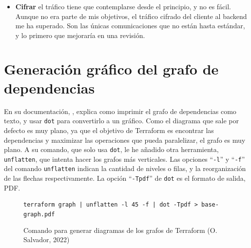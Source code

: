 \documentclass[11pt]{article}
\begin{document}
\begin{flushleft}
\begin{itemize}
            \item \textbf{Cifrar} el tráfico tiene que contemplarse desde el principio, y no es fácil. Aunque no era parte de mis objetivos, el tráfico cifrado del cliente al backend me ha superado. Son las únicas comunicaciones que no están hasta estándar, y lo primero que mejoraría en una revisión.
		\end{itemize}





























\clearpage
\appendix
\section{Generación gráfico del grafo de dependencias}
\label{anexo:grafico}
En su documentación, \cite{hashicorp_graph}, explica como imprimir el grafo de dependencias como texto, y usar \texttt{dot} para convertirlo a un gráfico. Como el diagrama que sale por defecto es muy plano, ya que el objetivo de Terraform es encontrar las dependencias y maximizar las operaciones que pueda paralelizar, el grafo es muy plano. A su comando, que solo usa \texttt{dot}, le he añadido otra herramienta, \texttt{unflatten}, que intenta hacer los grafos más verticales. Las opciones ``\texttt{-l}'' y ``\texttt{-f}'' del comando \texttt{unflatten} indican la cantidad de niveles o filas, y la reorganización de las flechas respectivamente. La opción ``\texttt{-Tpdf}'' de \texttt{dot} es el formato de salida, PDF.
\linebreak

    \begin{figure}[htb]
        \centering
        \footnotesize
        \texttt{terraform graph | unflatten -l 45 -f  | dot  -Tpdf  > base-graph.pdf} 
        \caption{Comando para generar diagramas de los grafos de Terraform (O. Salvador, 2022)}
    \end{figure}



\bigskip


\end{flushleft}
\end{document}
